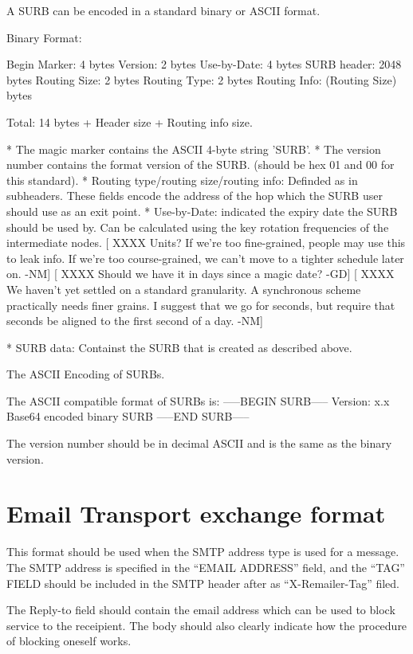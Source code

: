 A SURB can be encoded in a standard binary or ASCII format.

Binary Format:

   Begin Marker: 4 bytes
   Version:      2 bytes
   Use-by-Date:  4 bytes
   SURB header:  2048 bytes
   Routing Size: 2 bytes
   Routing Type: 2 bytes
   Routing Info: (Routing Size) bytes

   Total: 14 bytes + Header size + Routing info size.

* The magic marker contains the ASCII 4-byte string 'SURB'. 
* The version number contains the format version of the SURB.
  (should be hex 01 and 00 for this standard).
* Routing type/routing size/routing info: Definded as in subheaders.  
  These fields encode the address of the hop which the SURB user should
  use as an exit point.
* Use-by-Date: indicated the expiry date the SURB should be used by. Can
  be calculated using the key rotation frequencies of the intermediate
  nodes.
   [ XXXX Units? If we're too fine-grained, people may use this to
     leak info.  If we're too course-grained, we can't move to a
     tighter schedule later on.  -NM]
   [ XXXX Should we have it in days since a magic date? -GD]
   [ XXXX We haven't yet settled on a standard granularity.  A
      synchronous scheme practically needs finer grains.  I suggest
      that we go for seconds, but require that seconds be aligned to
      the first second of a day. -NM]
  
* SURB data: Containst the SURB that is created as described
  above. 

The ASCII Encoding of SURBs.

The  ASCII compatible format of SURBs is:
-----BEGIN SURB-----
Version: x.x
Base64 encoded binary SURB 
-----END SURB-----

The version number should be in decimal ASCII and is the same as the
binary version.

\section{Email Transport exchange format}

This format should be used when the SMTP address type is used for a
message. The SMTP address is specified in the ``EMAIL ADDRESS'' field,
and the ``TAG'' FIELD should be included in the SMTP header after as
``X-Remailer-Tag'' filed.

The Reply-to field should contain the email address which can be used
to block service to the receipient. The body should also clearly
indicate how the procedure of blocking oneself works.

